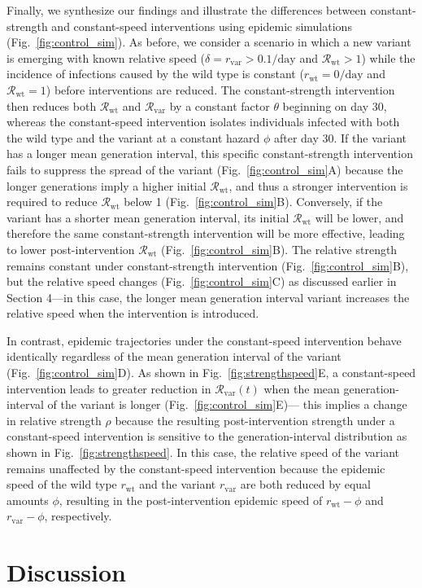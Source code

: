\documentclass[12pt]{article}
\newcommand{\fref}[1]{Fig.~\ref{fig:#1}}
\newcommand{\vvvar}{\mathrm{var}}
\newcommand{\wwwt}{\mathrm{wt}}
\newcommand{\rx}[1]{\ensuremath{{r}_{#1}}\xspace}
\newcommand{\rw}{\rx{\wwwt}}
\newcommand{\rv}{\rx{\vvvar}}
\newcommand{\Rx}[1]{\ensuremath{{\mathcal R}_{#1}}\xspace}
\newcommand{\Rw}{\Rx{\wwwt}}
\newcommand{\Rv}{\Rx{\vvvar}}
\newcommand{\pday}{\ensuremath{/\textrm{day}}}
\begin{document}
Finally, we synthesize our findings and illustrate the differences between constant-strength and constant-speed interventions using epidemic simulations (\fref{control_sim}).
As before, we consider a scenario in which a new variant is emerging with known relative speed ($\delta=\rv > 0.1\pday$ and $\Rw > 1$) while the incidence of infections caused by the wild type is constant ($\rw = 0\pday$ and $\Rw =1$) before interventions are reduced.
The constant-strength intervention then reduces both $\Rw$ and $\Rv$ by a constant factor $\theta$ beginning on day 30, 
whereas the constant-speed intervention isolates individuals infected with both the wild type and the variant at a constant hazard $\phi$ after day 30.
If the variant has a longer mean generation interval, this specific constant-strength intervention fails to suppress the spread of the variant (\fref{control_sim}A) because the longer generations imply a higher initial $\Rw$, and thus a stronger intervention is required to reduce $\Rw$ below 1 (\fref{control_sim}B).
Conversely, if the variant has a shorter mean generation interval, its initial $\Rw$ will be lower, and therefore the same constant-strength intervention will be more effective, leading to lower post-intervention $\Rw$ (\fref{control_sim}B).
The relative strength remains constant under constant-strength intervention (\fref{control_sim}B), but the relative speed changes (\fref{control_sim}C) as discussed earlier in Section 4---in this case, the longer mean generation interval variant increases the relative speed when the intervention is introduced.

In contrast, epidemic trajectories under the constant-speed intervention behave identically regardless of the mean generation interval of the variant (\fref{control_sim}D). 
As shown in \fref{strengthspeed}E, a constant-speed intervention leads to greater reduction in $\Rv(t)$ when the mean generation-interval of the variant is longer (\fref{control_sim}E)---
this implies a change in relative strength $\rho$ because the resulting post-intervention strength under a constant-speed intervention is sensitive to the generation-interval distribution as shown in \fref{strengthspeed}.
In this case, the relative speed of the variant remains unaffected by the constant-speed intervention because the epidemic speed of the wild type $\rw$ and the variant $\rv$ are both reduced by equal amounts $\phi$, resulting in the post-intervention epidemic speed of $\rw-\phi$ and $\rv-\phi$, respectively. 

\section{Discussion}
\end{document}
